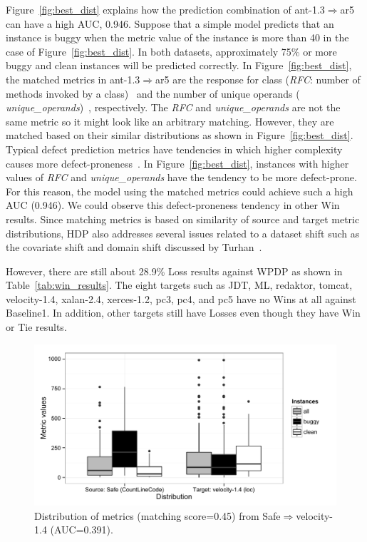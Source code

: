 Figure~\ref{fig:best_dist} explains how the prediction
combination of ant-1.3$\Rightarrow$ar5 can have a high AUC, 0.946. Suppose
that a simple model predicts that an instance is buggy when the metric value of
the instance is more than 40 in the case of Figure~\ref{fig:best_dist}. In both
datasets, approximately 75\% or more buggy and clean instances will be
predicted correctly. In Figure~\ref{fig:best_dist}, the matched metrics in
ant-1.3$\Rightarrow$ar5 are the response for class ({\em RFC}: number of methods
invoked by a class)~\cite{Chidamber94} and the number of unique operands ({\em
unique\_operands})~\cite{Halstead77}, respectively. The {\em RFC} and {\em
unique\_operands} are not the same metric so it might look like an arbitrary
matching. However, they are matched based on their similar distributions as
shown in Figure~\ref{fig:best_dist}. Typical defect prediction metrics have
tendencies in which higher complexity causes more
defect-proneness~\cite{DAmbros12,Menzies07,Rahman13}. In
Figure~\ref{fig:best_dist}, instances with higher values of {\em RFC} and {\em
unique\_operands} have the tendency to be more defect-prone. For this reason, the
model using the matched metrics could achieve such a high AUC (0.946). We could
observe this defect-proneness tendency in other Win results. Since matching metrics is
based on similarity of source and target metric distributions, HDP also
addresses several issues related to a dataset shift such as the covariate shift
and domain shift discussed by Turhan~\cite{Turhan12}.



However, there are still about 28.9\% Loss results against WPDP as shown in Table~\ref{tab:win_results}. The eight targets such as JDT, ML, redaktor, tomcat, velocity-1.4, xalan-2.4,
xerces-1.2, pc3, pc4, and pc5 have no Wins at all against Baseline1. In
addition, other targets still have Losses even though they have Win or Tie
results.


\begin{figure}[t]
	\centering
	\includegraphics[width=\linewidth]{Figures/Result/loss_dist_bplot.pdf}
	\caption{Distribution of metrics (matching score=0.45)
	from Safe$\Rightarrow$velocity-1.4 (AUC=0.391).}
	\label{fig:loss_dist}
\end{figure}


